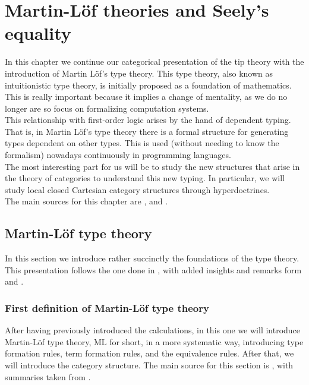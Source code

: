 
\chapter{Martin-L\"of theories and Seely's equality}
\label{chap:5}
\thispagestyle{empty}



In this chapter we continue our categorical presentation of the tip theory with the introduction of Martin L\"of's type theory. This type theory, also known as intuitionistic type theory, is initially proposed as a foundation of mathematics. This is really important because it implies a change of mentality, as we do no longer are so focus on formalizing computation systems. \\

This relationship with first-order logic arises by the hand of dependent typing. That is, in Martin Löf's type theory there is a formal structure for generating types dependent on other types. This is used (without needing to know the formalism) nowadays continuously in programming languages. \\

The most interesting part for us will be to study the new structures that arise in the theory of categories to understand this new typing. In particular, we will study local closed Cartesian category structures through hyperdoctrines. \\

The main sources for this chapter are  \cite{seely1984locally}, \cite{martinlof1973intuitionistic}  and \cite{mac2013categories}.



\section{Martin-Löf type theory}

In this section we introduce rather succinctly the foundations of the type theory. This presentation follows the one done in \cite{seely1984locally}, with added insights and remarks form \cite{martinlof1973intuitionistic} and \cite{sep-type-theory-intuitionistic}.



\subsection{First definition of Martin-Löf type theory}

After having previously introduced the calculations, in this one we will introduce Martin-L\"of type theory, ML for short, in a more systematic way, introducing type formation rules, term formation rules, and the equivalence rules. After that, we will introduce the category structure. The main source for this section is \cite{martinlof1973intuitionistic}, with summaries taken from \cite{seely1984locally}.\\

